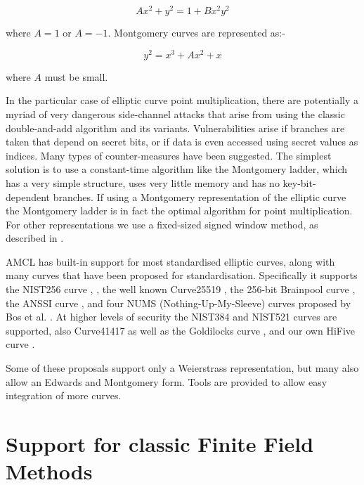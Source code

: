 \documentclass{llncs}
\begin{document}
$$ Ax^2+y^2=1+Bx^2y^2 $$

where $A=1$ or $A=-1$. Montgomery curves are represented as:-

$$ y^2=x^3+Ax^2+x $$

where $A$ must be small.

In the particular case of elliptic curve point multiplication, there are potentially a myriad of very dangerous side-channel attacks that arise from using the classic double-and-add algorithm
and its variants. Vulnerabilities arise if branches are taken that depend on secret bits, or if data is even accessed using secret values as indices.
Many types of counter-measures have been suggested. The simplest solution is to use a constant-time algorithm like the Montgomery ladder, which has a very simple structure, uses very little 
memory and has no key-bit-dependent branches. 
If using a Montgomery representation of the elliptic curve the Montgomery ladder \cite{montgomery2} is in fact the optimal algorithm for point multiplication. For other representations we use a 
fixed-sized signed window method, as described in \cite{bos-costello-longa-naehrig}. 

AMCL has built-in support for most standardised elliptic curves, along with many curves that have been proposed for standardisation. 
Specifically it supports the NIST256 curve \cite{certicom}, \cite{nist}, the well known Curve25519 \cite{bernstein}, the 256-bit Brainpool curve \cite{brainpool}, the ANSSI curve \cite{ANSSI}, and four
NUMS (Nothing-Up-My-Sleeve) curves proposed by Bos et al. \cite{bos-costello-longa-naehrig}. At higher levels of security the NIST384 and NIST521 curves are supported, also 
Curve41417 \cite{bernstein-chuengsatiansup-lange} as well as the Goldilocks curve \cite{hamburg}, and our own
Hi{F}ive curve \cite{scott3}.

Some of these proposals support only a Weierstrass representation, but many also allow an Edwards and Montgomery 
form. Tools are provided to allow easy integration of more curves.


\section{Support for classic Finite Field Methods}
\end{document}
